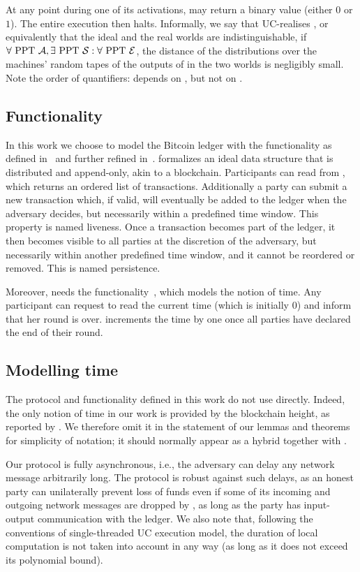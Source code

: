   At any point during one of its activations, \environment may return a binary
  value (either $0$ or $1$). The entire execution then halts. Informally, we say that \prot
  UC-realises \func, or equivalently that the ideal and the real worlds are
  indistinguishable, if $\forall \text{ PPT } \mathcal{A}, \exists \text{ PPT }
  \mathcal{S}: \forall \text{ PPT } \mathcal{E}$, the distance of the
  distributions over the machines' random tapes of the outputs of \environment
  in the two worlds is negligibly small. Note the order of quantifiers:
  \simulator depends on \adversary, but not on \environment.

  \subsection{\ledger Functionality}
  In this work we choose to model the Bitcoin ledger with the \ledger
  functionality as defined in~\cite{BMTZ17} and further refined
  in~\cite{genesis}. \ledger formalizes an ideal data structure that is
  distributed and append-only, akin to a blockchain. Participants can read from
  \ledger, which returns an ordered list of transactions. Additionally a party
  can submit a new transaction which, if valid, will eventually be added to the
  ledger when the adversary decides, but necessarily within a predefined time
  window. This property is named liveness. Once a transaction becomes part of
  the ledger, it then becomes visible to all parties at the discretion of the
  adversary, but necessarily within another predefined time window, and it
  cannot be reordered or removed. This is named persistence.

  Moreover, \ledger needs the \gFclock
  functionality~\cite{DBLP:conf/tcc/KatzMTZ13}, which models the notion of time.
  Any \gFclock participant can request to read the current time (which is
  initially 0) and inform \gFclock that her round is over. \gFclock increments the
  time by one once all parties have declared the end of their round.

  \subsection{Modelling time}
  The protocol and functionality defined in this work do not use \gFclock
  directly. Indeed, the only notion of time in our work is provided by the
  blockchain height, as reported by \ledger. We therefore omit it in the
  statement of our lemmas and theorems for simplicity of notation; it should
  normally appear as a hybrid together with \ledger.

  Our protocol is fully asynchronous, i.e., the adversary can delay any network
  message arbitrarily long. The protocol is robust against such delays, as an
  honest party can unilaterally prevent loss of funds even if some of its
  incoming and outgoing network messages are dropped by \adversary, as long as
  the party has input-output communication with the ledger. We also note that,
  following the conventions of single-threaded UC execution model, the duration of local
  computation is not taken into account in any way (as long as it does not
  exceed its polynomial bound).

